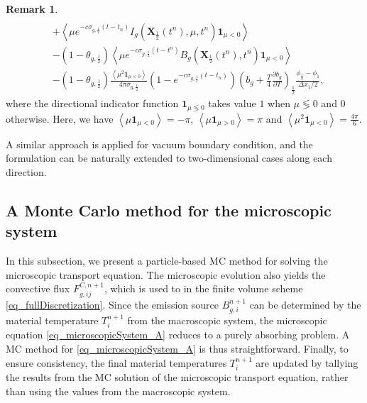 \documentclass[preprint,12pt]{elsarticle}
\theoremstyle{definition}
\newtheorem{remark}{Remark}[section]
\theoremstyle{plain}
\numberwithin{equation}{section}
\numberwithin{algorithm}{section}
\newcounter{eq_count}
\newcommand{\half}{\frac{1}{2}}
\newcommand{\mfx}{{\mathbf{X}}}
\newcommand{\pdrv}[2]{\frac{\partial{#1}}{\partial{#2}}}
\begin{document}
\begin{remark}
\begin{equation}
\begin{aligned}
            \\
            &+ \left\langle \mu e^{-c \sigma_{g,\frac{1}{2}}\left(t-t_n\right)} I_{g}\left( \mfx_{\frac{1}{2}}(t^n), \mu,t^n\right)\mathbf{1}_{\mu<0} \right\rangle  
            \\
            &- (1- \theta_{g,\half} )\left\langle \mu  e^{-c \sigma_{g,\frac{1}{2}} \left(t-t^n\right)}  B_g \left( \mfx_{\frac{1}{2}}(t^n),t^n\right)\mathbf{1}_{\mu<0} \right\rangle 
            \\
            &- ( 1 - \theta_{g,\half} ) \frac{\left\langle \mu^2 \mathbf{1}_{\mu<0}\right\rangle}{ 4 \pi \sigma_{g,\frac{1}{2}}}(1-e^{-c \sigma_{g,\frac{1}{2}}\left(t-t_n\right)})  (b_g + \frac{T}{4} \pdrv{b_g}{T})_{\half} \frac{\phi_{\half}  -  \phi_1 }{\Delta x_1 / 2},
		\end{aligned}
	\end{equation}
 where the directional indicator function $\mathbf{1}_{\mu \lessgtr 0}$ takes value $1$ when $\mu \lessgtr 0$ and 0 otherwise. Here, we have $\left\langle \mu\mathbf{1}_{\mu<0}\right\rangle = -\pi$, $\left\langle \mu \mathbf{1}_{\mu>0}\right\rangle = \pi$ and  $\left\langle \mu^2 \mathbf{1}_{\mu<0}\right\rangle = \frac{4 \pi}{6}$.
 
 A similar approach is applied for vacuum boundary condition, and the formulation can be naturally extended to two-dimensional cases along each direction.
\end{remark}

    \subsection{A Monte Carlo method for the microscopic system}
    In this subsection, we present a particle-based MC method for solving the microscopic transport equation. The microscopic evolution also yields the convective flux $F_{g,ij}^{C,n+1}$, which is used to in the finite volume scheme \eqref{eq_fullDiscretization}. Since the emission source $B_{g,i}^{n+1}$ can be determined by the material temperature $T_i^{n+1}$ from the macroscopic system, the microscopic equation \eqref{eq_microscopicSystem_A} reduces to a purely absorbing problem. A MC method for \eqref{eq_microscopicSystem_A} is thus straightforward. Finally, to ensure consistency, the final material temperatures $T_i^{n+1}$ are updated by tallying the results from the MC solution of the microscopic transport equation, rather than using the values from the macroscopic system.
    
\end{document}
